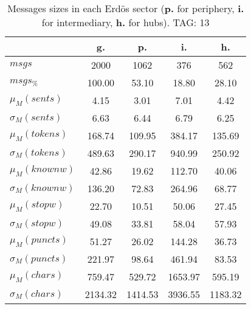 \begin{table}[h!]
\begin{center}
\begin{tabular}{| l || c | c | c | c |}\hline
 & {\bf g.} & {\bf p.} & {\bf i.} & {\bf h.} \\\hline\hline
$msgs$ & 2000  & 1062  & 376  & 562 \\
$msgs_{\%}$ & 100.00  & 53.10  & 18.80  & 28.10 \\\hline
$\mu_M(sents)$ & 4.15  & 3.01  & 7.01  & 4.42 \\
$\sigma_M(sents)$ & 6.63  & 6.44  & 6.79  & 6.25 \\\hline
$\mu_M(tokens)$ & 168.74  & 109.95  & 384.17  & 135.69 \\
$\sigma_M(tokens)$ & 489.63  & 290.17  & 940.99  & 250.92 \\\hline
$\mu_M(knownw)$ & 42.86  & 19.62  & 112.70  & 40.06 \\
$\sigma_M(knownw)$ & 136.20  & 72.83  & 264.96  & 68.77 \\\hline
$\mu_M(stopw)$ & 22.70  & 10.51  & 50.06  & 27.45 \\
$\sigma_M(stopw)$ & 49.08  & 33.81  & 58.04  & 57.93 \\\hline
$\mu_M(puncts)$ & 51.27  & 26.02  & 144.28  & 36.73 \\
$\sigma_M(puncts)$ & 221.97  & 98.64  & 461.94  & 83.53 \\\hline
$\mu_M(chars)$ & 759.47  & 529.72  & 1653.97  & 595.19 \\
$\sigma_M(chars)$ & 2134.32  & 1414.53  & 3936.55  & 1183.32 \\\hline
\end{tabular}
\caption{Messages sizes in each Erd\"os sector ({{\bf p.}} for periphery, {{\bf i.}} for intermediary, {{\bf h.}} for hubs). TAG: 13}
\end{center}
\end{table}